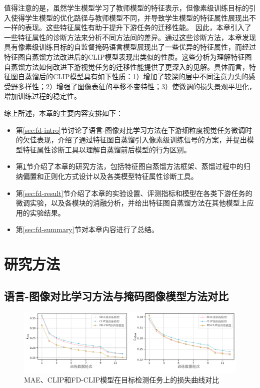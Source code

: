 值得注意的是，虽然学生模型学习了教师模型的特征表示，但像素级训练目标的引入使得学生模型的优化路径与教师模型不同，并导致学生模型的特征属性展现出不一样的表现。这些特征属性有助于提升下游任务的迁移性能\cite{xie2023revealing}。
因此，本章引入了一些特征属性的诊断方法来分析不同方法间的差异。通过这些诊断方法，本章发现具有像素级训练目标的自监督掩码语言模型展现出了一些优异的特征属性，而经过特征图自蒸馏方法改进后的CLIP模型表现出类似的性质。这些分析为理解特征图自蒸馏方法如何改进下游视觉任务的迁移性能提供了更深入的见解。具体而言，特征图自蒸馏后的CLIP模型具有如下性质：1）增加了较深的层中不同注意力头的感受野多样性；2）增强了图像表征的平移不变特性；3）使微调的损失景观平坦化，增加训练过程的稳定性。

综上所述，本章的主要内容安排如下：
\begin{itemize}
    \item 第\ref{sec:fd-intro}节讨论了语言-图像对比学习方法在下游细粒度视觉任务微调时的欠佳表现，介绍了通过特征图自蒸馏引入像素级训练信号的方案，并提出模型特征属性诊断工具以理解自蒸馏前后模型的行为区别。
    \item 第\ref{sec:fd-method}节介绍了本章的研究方法，包括特征图自蒸馏方法框架、蒸馏过程中的归纳偏置和正则化方式设计以及各类模型特征属性诊断工具。
    \item 第\ref{sec:fd-result}节介绍了本章的实验设置、评测指标和模型在各类下游任务的微调实验，以及各模块的消融分析，并给出特征图自蒸馏方法在其他模型上应用的实验结果。
    \item 第\ref{sec:fd-summary}节对本章内容进行了总结。
\end{itemize}

\section{研究方法}
\label{sec:fd-method}

\subsection{语言-图像对比学习方法与掩码图像模型方法对比}
\begin{figure}
  \centering
  \includegraphics[width=1.0\linewidth]{figures/fd-coco-abl.pdf}
  \caption{MAE、CLIP和FD-CLIP模型在目标检测任务上的损失曲线对比}
  \label{fig:fd-coco-abl}
\end{figure}

